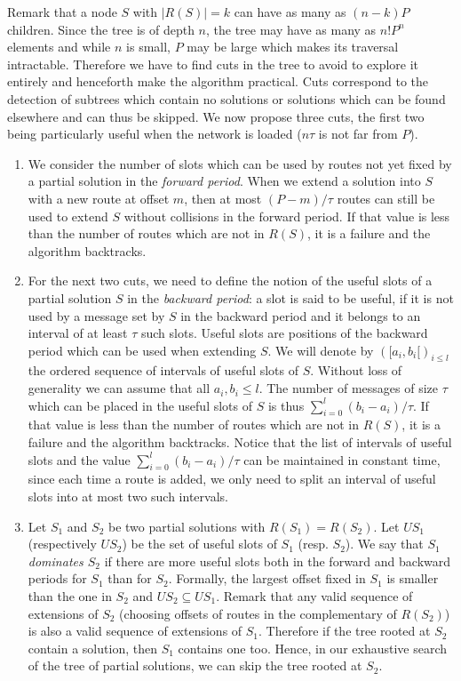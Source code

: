 \documentclass[a4paper,10pt]{article}
\begin{document}
      Remark that a node $S$ with $|R(S)| = k$ can have as many as $(n-k)P$ children. Since the tree is of depth $n$, the tree may have as many as $n!P^n$ elements and while $n$ is small, $P$ may be large which makes its traversal intractable.  Therefore we have to find cuts in the tree to avoid to explore it entirely and henceforth make the algorithm practical. Cuts correspond to the detection of subtrees which contain no solutions or solutions which can be found elsewhere and can thus be skipped. We now propose three cuts, the first two being particularly useful when the network is loaded ($n\tau$ is not far from $P$). 
      
      \begin{enumerate}
       \item We consider the number of slots which can be used by routes not yet fixed by a partial solution in the \emph{forward period}. When we extend a solution into $S$ with a new route at offset $m$, then at most $(P - m) / \tau $ routes can still be used to extend $S$ without collisions in the forward period. If that value is less than the number of routes which are not in $R(S)$, it is a failure and the algorithm backtracks.
       
       \item 
       For the next two cuts, we need to define the notion of the useful slots of a partial solution $S$ in the \emph{backward period}: a slot is said to be useful, if it is not used by a message set by $S$ in the backward period and it belongs to an interval of at least $\tau$ such slots. Useful slots are positions of the backward period which can be used when extending $S$. We will denote by $([a_i,b_i[)_{i\leq l}$ the ordered sequence of intervals of useful slots of $S$. Without loss of generality we can assume that all $a_i, b_i \leq l$. The number of messages of size $\tau$ which can be placed in the useful slots of $S$ is thus  $\displaystyle{ \sum_{i=0}^{l} (b_{i} -a_i)/\tau } $. If that value is less than the number of routes which are not in $R(S)$, it is a failure and the algorithm backtracks. Notice that the list of intervals of useful slots and the value $\displaystyle{ \sum_{i=0}^{l} (b_{i} -a_i)/\tau } $ can be maintained in constant time, since each time a route is added, we only need to split an interval of useful slots into at most two such intervals.
       
       
       \item 
       Let $S_1$ and $S_2$ be two partial solutions with $R(S_1) = R(S_2)$. Let $US_1$ (respectively $US_2$) be the set of useful slots of $S_1$ (resp. $S_2$). We say that \emph{$S_1$ dominates $S_2$} if there are more useful slots both in the forward and backward periods for $S_1$ than for $S_2$. Formally, the largest offset fixed in $S_1$ is smaller than the one in $S_2$ and $US_2 \subseteq US_1$. Remark that any valid sequence of extensions of $S_2$ (choosing offsets of routes in the complementary of $R(S_2)$) is also a valid sequence of extensions of $S_1$. Therefore if the tree rooted at $S_2$ contain a solution, then $S_1$ contains one too. Hence, in our exhaustive search of the tree of partial solutions, we can skip the tree rooted at $S_2$.
       

\end{enumerate}
\end{document}
